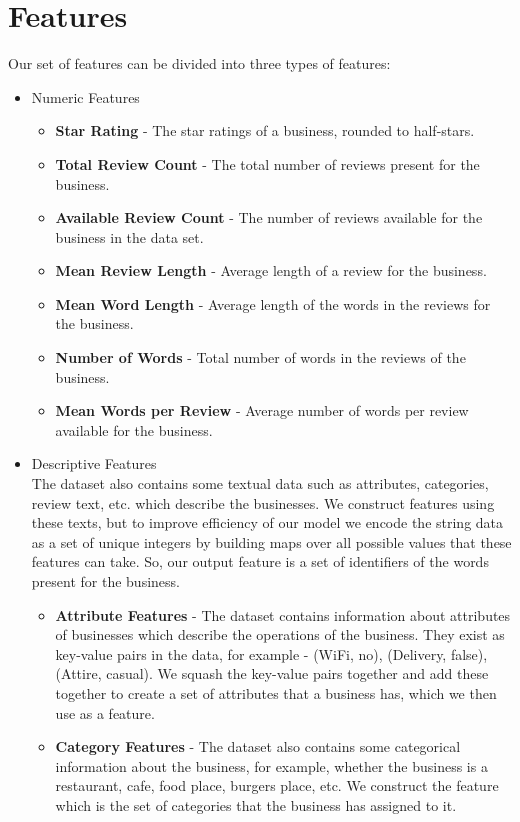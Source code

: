 \documentclass{article}
\begin{document}
\section{Features}
Our set of features can be divided into three types of features:
\begin{itemize}
	\item Numeric Features
		\begin{itemize}
			\item \textbf{Star Rating} - The star ratings of a business, rounded to half-stars.
			\item \textbf{Total Review Count} - The total number of reviews present for the business. 
            \item \textbf{Available Review Count} - The number of reviews available for the business in the data set.
            \item \textbf{Mean Review Length} - Average length of a review for the business.
            \item \textbf{Mean Word Length} - Average length of the words in the reviews for the business.
            \item \textbf{Number of Words} - Total number of words in the reviews of the business.
            \item \textbf{Mean Words per Review} - Average number of words per review available for the business.
		\end{itemize}
	\item Descriptive Features \\
The dataset also contains some textual data such as attributes, categories, review text, etc. which describe the businesses. We construct features using these texts, but to improve efficiency of our model we encode the string data as a set of unique integers by building maps over all possible values that these features can take. So, our output feature is a set of identifiers of the words present for the business.
    	\begin{itemize}
    		\item \textbf{Attribute Features} - The dataset contains information about attributes of businesses which describe the operations of the business. They exist as key-value pairs in the data, for example - (WiFi, no), (Delivery, false), (Attire, casual). We squash the key-value pairs together and add these together to create a set of attributes that a business has, which we then use as a feature.
            \item \textbf{Category Features} - The dataset also contains some categorical information about the business, for example, whether the business is a restaurant, cafe, food place, burgers place, etc. We construct the feature which is the set of categories that the business has assigned to it. 

\end{itemize}
\end{itemize}
\end{document}
